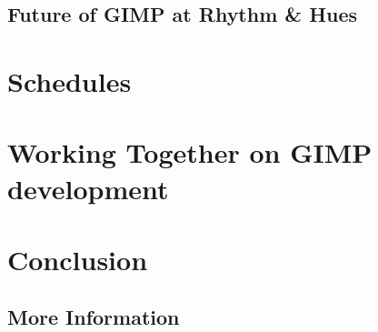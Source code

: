 \documentclass{report}
\begin{document}
\section{Future of GIMP at Rhythm \& Hues} 


\chapter{Schedules}


\chapter{Working Together on GIMP development}



\chapter{Conclusion}


\section{More Information}


{
\small


}
\end{document}
